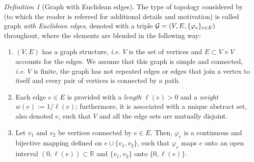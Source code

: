 \documentclass[12pt]{article}
\theoremstyle{plain}
\theoremstyle{remark}
\newtheorem{definition}[theorem]{Definition}
\newcommand{\R}[0]{\mathbb{R}}
\newcommand{\ie}{\textit{i.e. }}
\begin{document}
     
    \begin{definition}[Graph with Euclidean edges]
        \label{def:graphWithEE}
        The type of topology considered by \cite{anderes_isotropic_2020} (to which the reader is referred for additional details and motivation) is called graph {\em with Euclidean edges}, denoted with a triple ${\cal G}=\left( V,E,\{\varphi_e\}_{e\in E} \right)$ throughout, where the elements are blended in the following way:
        \begin{enumerate}
            \item[(a)] {{$(V, E)$}} has a graph structure, \ie $V$ is the set of vertices and {$E\subset V\times V$} accounts for the edges. We assume that this graph is simple and connected, \ie $V$ is finite, the graph has not repeated edges or edges that join a vertex to itself and every pair of vertices is connected by a path.
            \item[(b)] Each edge $e\in E$ is provided with a \emph{length} $\ell(e)>0$ and a \emph{weight} $w(e):=1/\ell(e)$; furthermore, it is associated with a unique abstract set, also denoted $e$, such that $V$ and all the edge sets are mutually disjoint. 
            \item[(c)] Let  $v_1$ and $v_2$ be vertices connected by $e\in E$. Then, $\varphi_e$ is a continuous and bijective mapping defined on $e \cup \{v_1,v_2\}$, such that $\varphi_e$ maps $e$ onto an open interval $(0,\ell(e)) \subset \R$ and $\{v_1,v_2\}$ onto $\{0,\ell(e)\}$.
        \end{enumerate}

\end{definition}
\end{document}
